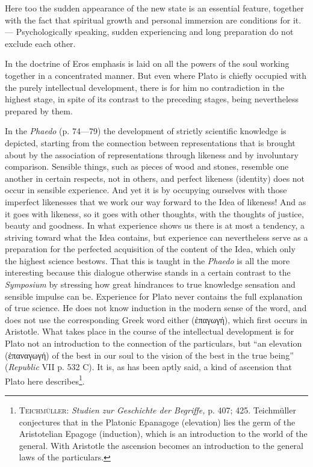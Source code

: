 \documentclass[12pt,a4paper,openany]{book}
\newcommand{\opage}[1]{\marginnote{\footnotesize\textit{[#1]}}}
\begin{document}
Here too the sudden appearance of the new state is
an essential feature, together with the fact that spiritual growth and personal
immersion are conditions for it.  --- Psychologically speaking,
sudden experiencing and long preparation do not exclude each other.

In the doctrine of Eros emphasis is laid on all the powers of the soul
working together in a concentrated manner.  But even
where Plato is chiefly occupied with the purely intellectual
development, there is for him no contradiction in the
highest stage, in spite of its contrast to the preceding
stages, being nevertheless prepared by them.

In the \textit{Phaedo} (p. 74—79) the development of strictly scientific
knowledge is depicted, starting from the connection between
representations that is brought about by the association of representations
through likeness and by involuntary comparison.  Sensible
things, such as pieces of wood and stones, resemble one another in
certain respects, not in others, and perfect likeness (identity)
does not occur in sensible experience.  And yet it is by
occupying ourselves with those imperfect likenesses that we work our way
forward to the Idea of likeness!  And as it goes with likeness, so it goes
with other thoughts, with the thoughts of justice,
beauty and goodness.  In what experience shows us there is at
most a tendency, a striving toward what the Idea contains,
but experience can nevertheless serve as a preparation
\setcounter{footnote}{0}%
\opage{51}for the perfected acquisition of the content of the Idea, which only the
highest science bestows.  That this is taught in the \textit{Phaedo} is all the more
interesting because this dialogue otherwise stands in a certain
contrast to the \textit{Symposium} by stressing how great
hindrances to true knowledge sensation and sensible
impulse can be.  Experience for Plato never contains the
full explanation of true science.  He does not know
induction in the modern sense of the word, and does not use
the corresponding Greek word either (ἐπαγωγή), which first occurs
in Aristotle.  What takes place in the course of the intellectual
development is for Plato not an introduction to the
connection of the particulars, but ``an elevation (ἐπαναγωγή)
of the best in our soul to the vision of the best in the true
being'' (\textit{Republic} VII p. 532 C).  It is, as has been aptly
said, a kind of ascension that Plato here describes\footnote[1]{\textsc{Teichmüller}: \textit{Studien zur Geschichte der Begriffe,} p. 407; 425.  Teichmüller conjectures that in the Platonic Epanagoge (elevation) lies the germ of the Aristotelian Epagoge (induction), which is an introduction to the world of the general.  With Aristotle the ascension becomes an introduction to the general laws of the particulars.}.
\end{document}
